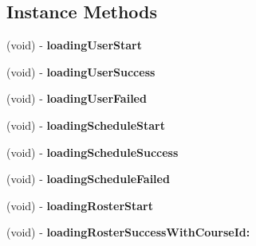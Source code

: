 \subsection*{Instance Methods}
\begin{DoxyCompactItemize}
\item 
\hypertarget{protocol_h_t_t_p_manager_delegate-p_a15b7cbca7478eeeea8e44c30dec70363}{(void) -\/ {\bfseries loading\+User\+Start}}\label{protocol_h_t_t_p_manager_delegate-p_a15b7cbca7478eeeea8e44c30dec70363}

\item 
\hypertarget{protocol_h_t_t_p_manager_delegate-p_a7f019b4b16362379e19ac046fcf70d6f}{(void) -\/ {\bfseries loading\+User\+Success}}\label{protocol_h_t_t_p_manager_delegate-p_a7f019b4b16362379e19ac046fcf70d6f}

\item 
\hypertarget{protocol_h_t_t_p_manager_delegate-p_aa55180501fad2aaec7d5985aa7034cb9}{(void) -\/ {\bfseries loading\+User\+Failed}}\label{protocol_h_t_t_p_manager_delegate-p_aa55180501fad2aaec7d5985aa7034cb9}

\item 
\hypertarget{protocol_h_t_t_p_manager_delegate-p_a17aed3c940fab56be60086cd63dd857c}{(void) -\/ {\bfseries loading\+Schedule\+Start}}\label{protocol_h_t_t_p_manager_delegate-p_a17aed3c940fab56be60086cd63dd857c}

\item 
\hypertarget{protocol_h_t_t_p_manager_delegate-p_ad040e1934c0748b336972aa9a0e45921}{(void) -\/ {\bfseries loading\+Schedule\+Success}}\label{protocol_h_t_t_p_manager_delegate-p_ad040e1934c0748b336972aa9a0e45921}

\item 
\hypertarget{protocol_h_t_t_p_manager_delegate-p_a23da4326fa82d5b0b78715b73ff26d9e}{(void) -\/ {\bfseries loading\+Schedule\+Failed}}\label{protocol_h_t_t_p_manager_delegate-p_a23da4326fa82d5b0b78715b73ff26d9e}

\item 
\hypertarget{protocol_h_t_t_p_manager_delegate-p_a603f6b04ea5070de1b2945e80d965ed8}{(void) -\/ {\bfseries loading\+Roster\+Start}}\label{protocol_h_t_t_p_manager_delegate-p_a603f6b04ea5070de1b2945e80d965ed8}

\item 
\hypertarget{protocol_h_t_t_p_manager_delegate-p_aaa059c990a4a9cf66a5ea7fdc47b1a5f}{(void) -\/ {\bfseries loading\+Roster\+Success\+With\+Course\+Id\+:}}\label{protocol_h_t_t_p_manager_delegate-p_aaa059c990a4a9cf66a5ea7fdc47b1a5f}


\end{DoxyCompactItemize}
